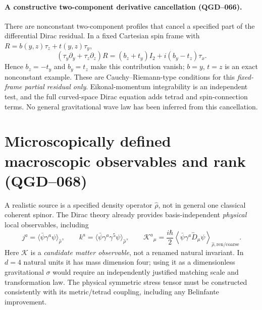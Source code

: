 \documentclass[11pt,a4paper]{article}
\begin{document}
\paragraph{A constructive two-component derivative cancellation (QGD--066).}
There are nonconstant two-component profiles that cancel a specified
part of the differential Dirac residual. In a fixed Cartesian spin frame
with $R=b(y,z)\tau_z+t(y,z)\tau_y$,
\begin{equation}\label{eq:qgd075-CR}
 (\tau_y\partial_y+\tau_z\partial_z)R
 =(b_z+t_y)I_2+i(b_y-t_z)\tau_x.
\end{equation}
Hence $b_z=-t_y$ and $b_y=t_z$ make this contribution vanish;
$b=y$, $t=z$ is an exact nonconstant example. These are
Cauchy--Riemann-type conditions for this \emph{fixed-frame partial
residual only}. Eikonal-momentum integrability is an independent test,
and the full curved-space Dirac equation adds tetrad and spin-connection
terms. No general gravitational wave law has been inferred from this
cancellation.


\section{Microscopically defined macroscopic observables and rank (QGD--068)}\label{sec:qgd075-observables}
A realistic source is a specified density operator $\hat\rho$, not in
general one classical coherent spinor. The Dirac theory already provides
basis-independent \emph{physical} local observables, including
\begin{equation}\label{eq:qgd075-bilinears}
 j^a=\langle\bar\psi\gamma^a\psi\rangle_{\hat\rho},\qquad
 k^a=\langle\bar\psi\gamma^a\gamma^5\psi\rangle_{\hat\rho},\qquad
 \boxed{\mathcal K^a{}_{\mu}=\frac{i\hbar}{2}\left\langle
 \bar\psi\gamma^a\overleftrightarrow D_{\!\mu}\psi
 \right\rangle_{\!\hat\rho,\mathrm{ren/coarse}}.}
\end{equation}
Here $\mathcal K$ is a \emph{candidate matter observable}, not a
renamed natural invariant. In $d=4$ natural units it has mass dimension
four; using it as a dimensionless gravitational $\sigma$ would require an
independently justified matching scale and transformation law. The
physical symmetric stress tensor must be constructed consistently with
its metric/tetrad coupling, including any Belinfante improvement.
\end{document}

